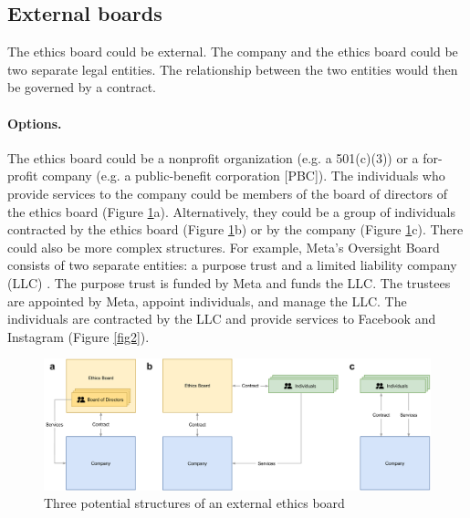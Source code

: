 \documentclass{article}
\begin{document}
\subsection{External boards}\label{Ch:3:1:external}

The ethics board could be external. The company and the ethics board could be two separate legal entities. The relationship between the two entities would then be governed by a contract.

\paragraph{Options.} The ethics board could be a nonprofit organization (e.g. a 501(c)(3)) or a for-profit company (e.g. a public-benefit corporation [PBC]). The individuals who provide services to the company could be members of the board of directors of the ethics board (Figure \ref{fig1}a). Alternatively, they could be a group of individuals contracted by the ethics board (Figure \ref{fig1}b) or by the company (Figure \ref{fig1}c). There could also be more complex structures. For example, Meta’s Oversight Board consists of two separate entities: a purpose trust and a limited liability company (LLC) \cite{oversightboard2023trustees, thomas2019independence}. The purpose trust is funded by Meta and funds the LLC. The trustees are appointed by Meta, appoint individuals, and manage the LLC. The individuals are contracted by the LLC and provide services to Facebook and Instagram (Figure \ref{fig2}).

\begin{figure}
    \includegraphics[width=\textwidth]{structures.pdf}
    \caption{Three potential structures of an external ethics board}
    \label{fig1}
\end{figure}
\end{document}
